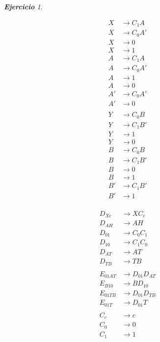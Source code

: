 \documentclass[12pt,spanish]{article}
\theoremstyle{definition}
\theoremstyle{remark}
\newtheorem{exercise}{\textbf{Ejercicio}}%
\begin{document}
\begin{exercise}
\begin{multicols}{3}
    \begin{align*}
      X&\rightarrow C_1A \\
      X&\rightarrow C_0A' \\
      X&\rightarrow 0 \\
      X&\rightarrow 1 \\
      A&\rightarrow C_1A \\
      A&\rightarrow C_0A' \\
      A&\rightarrow 1 \\
      A&\rightarrow 0 \\
      A'&\rightarrow C_0A' \\
      A'&\rightarrow 0 \\
      ~ \\
      Y&\rightarrow C_0B \\
      Y&\rightarrow C_1B' \\
      Y&\rightarrow 1 \\
      Y&\rightarrow 0 \\
      B&\rightarrow C_0B \\
      B&\rightarrow C_1B' \\
      B&\rightarrow 0 \\
      B&\rightarrow 1 \\
      B'&\rightarrow C_1B' \\
      B'&\rightarrow 1 \\
    \end{align*}

    \columnbreak

    \begin{align*}
      D_{Xc}&\rightarrow XC_c \\
      D_{AH}&\rightarrow AH \\
      D_{01}&\rightarrow C_0C_1 \\
      D_{10}&\rightarrow C_1C_0 \\
      D_{AT}&\rightarrow AT \\
      D_{TB}&\rightarrow TB \\
      ~ \\
      E_{01AT}&\rightarrow D_{01}D_{AT} \\
      E_{B10}&\rightarrow BD_{10} \\
      E_{01TB}&\rightarrow D_{01}D_{TB} \\
      E_{01T}&\rightarrow D_{01}T \\
      ~ \\
      C_c&\rightarrow c \\
      C_0&\rightarrow 0 \\
      C_1&\rightarrow 1 \\
      ~ \\ ~ \\ ~ \\ ~ \\ ~ \\ ~ \\ ~
    \end{align*}
  \end{multicols}


\end{exercise}
\end{document}
